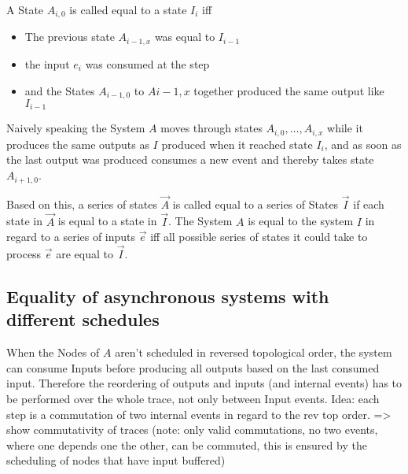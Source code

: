 A State \(A_{i,0}\) is called equal to a state \(I_{i}\) iff

\begin{itemize}
  \item The previous state \(A_{i-1,x}\) was equal to \(I_{i-1}\)
  \item the input \(e_i\) was consumed at the step
  \item and the States \(A_{i-1,0}\) to \(A{i-1,x}\) together produced the same output like \(I_{i-1}\)
\end{itemize}

Naively speaking the System \(A\) moves through states \(A_{i,0},\dots,A_{i,x}\) while it produces the same outputs as \(I\)
produced when it reached state \(I_i\), and as soon as the last output was produced consumes a new event and thereby takes
state \(A_{i+1,0}\).

Based on this, a series of states \(\vec{A}\) is called equal to a series of States \(\vec{I}\) if each state in \(\vec{A}\)
is equal to a state in \(\vec{I}\).
The System \(A\) is equal to the system \(I\) in regard to a series of inputs \(\vec{e}\) iff all possible series of
states it could take to process \(\vec{e}\) are equal to \(\vec{I}\).

\subsection{Equality of asynchronous systems with different schedules}
\label{sec:concepts:equalitys_without_timing:async_any_async_topological}

When the Nodes of \(A\) aren't scheduled in reversed topological order, the system can consume Inputs before producing all outputs
based on the last consumed input.
Therefore the reordering of outputs and inputs (and internal events) has to be performed over the whole trace, not only between Input events.
Idea: each step is a commutation of two internal events in regard to the rev top order.
=> show commutativity of traces (note: only valid commutations, no two events, where one depends one the other, can be commuted, this is ensured by the scheduling of nodes that have input buffered)




